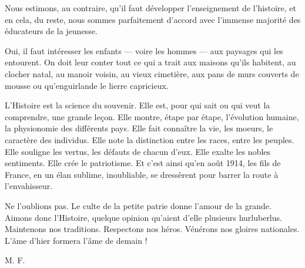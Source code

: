 Nous estimons, au contraire, qu'il faut développer l'enseignement de l'histoire, et en cela, du reste, nous sommes parfaitement d'accord avec l'immense majorité des
éducateurs de la jeunesse.

Oui, il faut intéresser les enfants — voire les hommes — aux paysages qui les entourent. On doit leur conter tout ce qui a trait aux maisons qu'ils habitent, au clocher natal, au manoir voisin, au vieux cimetière, aux pans de murs couverts de mousse ou qu'enguirlande le lierre capricieux.

L'Histoire est la science du souvenir. Elle est, pour qui sait ou qui veut la comprendre, une grande leçon. Elle montre, étape par étape, l'évolution humaine, la physionomie des différents pays. Elle fait connaître la vie, les moeurs, le caractère des individus. Elle note la distinction entre les races, entre les peuples. Elle souligne les vertus, les défauts de chacun d'eux. Elle exalte les nobles sentiments. Elle crée le patriotisme. Et c'est ainsi qu'en août 1914, les fils de France, en un élan sublime, inoubliable, se dressèrent pour barrer la route à l'envahisseur.

Ne l'oublions pas. Le culte de la petite patrie donne l'amour de la grande. Aimons donc l'Histoire, quelque opinion qu'aient d'elle plusieurs hurluberlus. Maintenons nos traditions. Respectons nos héros. Vénérons nos gloires nationales. L'âme d'hier formera l'âme de demain !

M. F.